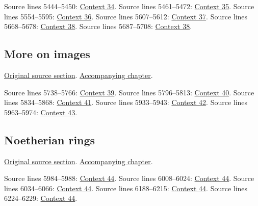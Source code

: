\begin{AlgebraSourceRoutes}
 Source lines 5444--5450: \hyperlink{algebra-context-034}{Context 34}.
 Source lines 5461--5472: \hyperlink{algebra-context-035}{Context 35}.
 Source lines 5554--5595: \hyperlink{algebra-context-036}{Context 36}.
 Source lines 5607--5612: \hyperlink{algebra-context-037}{Context 37}.
 Source lines 5668--5678: \hyperlink{algebra-context-038}{Context 38}.
 Source lines 5687--5708: \hyperlink{algebra-context-038}{Context 38}.
\end{AlgebraSourceRoutes}

\subsection{More on images}
\hypertarget{algebra-source-section-more-images}{}
\noindent\href{https://github.com/stacks/stacks-project/blob/a04446e57ec1fbc252a871afcec7752fb2807b14/algebra.tex\#L5721}{Original source section}. \href{algebra.pdf\#nameddest=section-more-images}{Accompanying chapter}.

\begin{AlgebraSourceRoutes}
 Source lines 5738--5766: \hyperlink{algebra-context-039}{Context 39}.
 Source lines 5796--5813: \hyperlink{algebra-context-040}{Context 40}.
 Source lines 5834--5868: \hyperlink{algebra-context-041}{Context 41}.
 Source lines 5933--5943: \hyperlink{algebra-context-042}{Context 42}.
 Source lines 5963--5974: \hyperlink{algebra-context-043}{Context 43}.
\end{AlgebraSourceRoutes}

\subsection{Noetherian rings}
\hypertarget{algebra-source-section-Noetherian}{}
\noindent\href{https://github.com/stacks/stacks-project/blob/a04446e57ec1fbc252a871afcec7752fb2807b14/algebra.tex\#L5980}{Original source section}. \href{algebra.pdf\#nameddest=section-Noetherian}{Accompanying chapter}.

\begin{AlgebraSourceRoutes}
 Source lines 5984--5988: \hyperlink{algebra-context-044}{Context 44}.
 Source lines 6008--6024: \hyperlink{algebra-context-044}{Context 44}.
 Source lines 6034--6066: \hyperlink{algebra-context-044}{Context 44}.
 Source lines 6188--6215: \hyperlink{algebra-context-044}{Context 44}.
 Source lines 6224--6229: \hyperlink{algebra-context-044}{Context 44}.
\end{AlgebraSourceRoutes}

